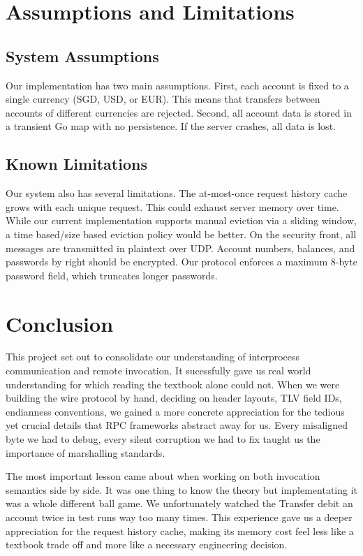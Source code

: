 \documentclass[9pt,a4paper]{article}
\begin{document}
\section{Assumptions and Limitations }
 
\subsection{System Assumptions}
 
Our implementation has two main assumptions.
First, each account is fixed to a single currency (SGD, USD, or EUR).
This means that transfers between accounts of different currencies are rejected. 
Second, all account data is stored in a transient Go map with no persistence.
If the server crashes, all data is lost.
 
\subsection{Known Limitations}
 
Our system also has several limitations.
The at-most-once request history cache grows with each unique request.
This could exhaust server memory over time. 
While our current implementation supports manual eviction via a sliding window, a time based/size based eviction policy would be better.
On the security front, all messages are transmitted in plaintext over UDP.
Account numbers, balances, and passwords by right should be encrypted.
Our protocol enforces a maximum 8-byte password field, which truncates longer passwords.
 
\section{Conclusion}
 
This project set out to consolidate our understanding of interprocess communication and remote invocation.
It sucessfully gave us real world understanding for which reading the textbook alone could not. 
When we were building the wire protocol by hand, deciding on header layouts, TLV field IDs, endianness conventions, we gained a more concrete appreciation for the tedious yet crucial details that RPC frameworks abstract away for us.
Every misaligned byte we had to debug, every silent corruption we had to fix taught us the importance of marshalling standards.
 
The most important lesson came about when working on both invocation semantics side by side.
It was one thing to know the theory but implementating it was a whole different ball game.
We unfortunately watched the Transfer debit an account twice in test runs way too many times.
This experience gave us a deeper appreciation for the request history cache, making its memory cost feel less like a textbook trade off and more like a necessary engineering decision.
\end{document}
